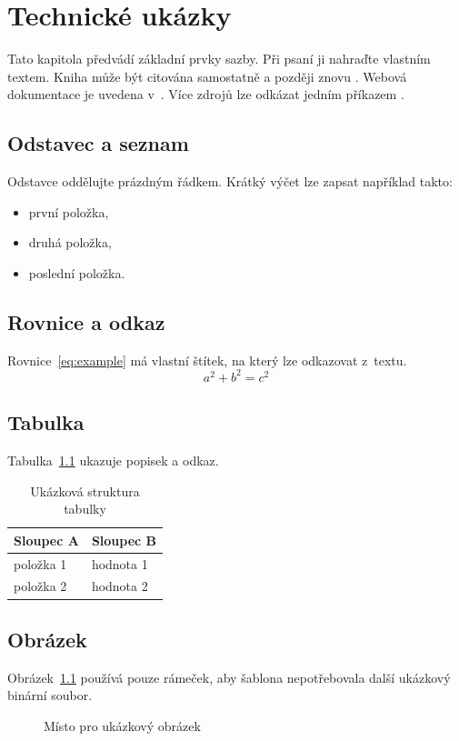 \chapter{Technické ukázky}
\label{chap:examples}

Tato kapitola předvádí základní prvky sazby. Při psaní ji nahraďte vlastním
textem. Kniha může být citována samostatně \cite{latex-companion} a později
znovu \cite{latex-companion}. Webová dokumentace je uvedena v~\cite{latex-docs}.
Více zdrojů lze odkázat jedním příkazem \cite{knuth1984,grobid2009}.

\section{Odstavec a seznam}

Odstavce oddělujte prázdným řádkem. Krátký výčet lze zapsat například takto:
\begin{itemize}
  \item první položka,
  \item druhá položka,
  \item poslední položka.
\end{itemize}

\section{Rovnice a odkaz}

Rovnice~\eqref{eq:example} má vlastní štítek, na který lze odkazovat z~textu.
\begin{equation}
  a^2 + b^2 = c^2
  \label{eq:example}
\end{equation}

\section{Tabulka}

Tabulka~\ref{tab:example} ukazuje popisek a odkaz.
\begin{table}[ht]
  \centering
  \caption{Ukázková struktura tabulky}
  \label{tab:example}
  \begin{tabular}{ll}
    \toprule
    Sloupec A & Sloupec B \\
    \midrule
    položka 1 & hodnota 1 \\
    položka 2 & hodnota 2 \\
    \bottomrule
  \end{tabular}
\end{table}

\section{Obrázek}

Obrázek~\ref{fig:example} používá pouze rámeček, aby šablona nepotřebovala
další ukázkový binární soubor.
\begin{figure}[ht]
  \centering
  \fbox{\rule{0pt}{35mm}\rule{0.65\textwidth}{0pt}}
  \caption{Místo pro ukázkový obrázek}
  \label{fig:example}
\end{figure}

